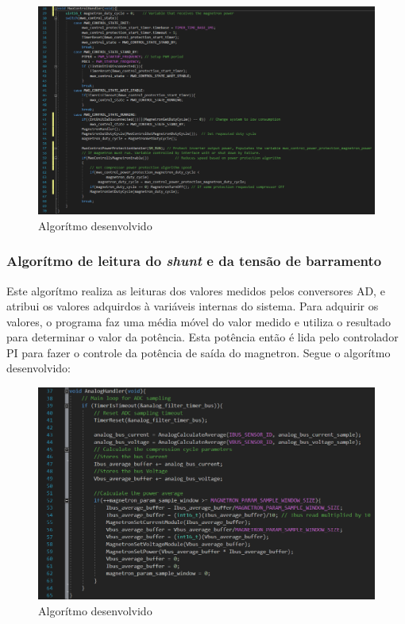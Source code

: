 \begin{figure}[H]
    \centering
    \includegraphics[width=1\textwidth]{./dados/figuras/func_mwo}
    \caption{Algorítmo desenvolvido}
    \label{fig:figura-magnetron-usado}
\end{figure}

\subsubsection{Algorítmo de leitura do \textit{shunt} e da tensão de barramento}
Este algorítmo realiza as leituras dos valores medidos pelos conversores AD, e atribui os valores adquirdos à variáveis internas do sistema. Para adquirir os valores, o programa faz uma média móvel do valor medido e utiliza o resultado para determinar o valor da potência. Esta potência então é lida pelo controlador PI para fazer o controle da potência de saída do magnetron. Segue o algorítmo desenvolvido:

\begin{figure}[H]
    \centering
    \includegraphics[width=1\textwidth]{./dados/figuras/func_analog}
    \caption{Algorítmo desenvolvido}
    \label{fig:figura-magnetron-usado}
\end{figure}

